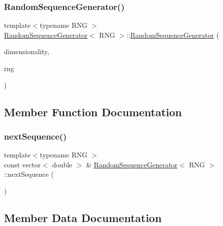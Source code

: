 \subsubsection{\texorpdfstring{Random\+Sequence\+Generator()}{RandomSequenceGenerator()}}
{\footnotesize\ttfamily template$<$typename R\+NG $>$ \\
\hyperlink{class_random_sequence_generator}{Random\+Sequence\+Generator}$<$ R\+NG $>$\+::\hyperlink{class_random_sequence_generator}{Random\+Sequence\+Generator} (\begin{DoxyParamCaption}\item[{vector$<$ double $>$\+::size\+\_\+type}]{dimensionality,  }\item[{const R\+NG \&}]{rng }\end{DoxyParamCaption})}



\subsection{Member Function Documentation}
\hypertarget{class_random_sequence_generator_a63f2d6fdb7f7bab6cdf3506f91cc814c}{}\label{class_random_sequence_generator_a63f2d6fdb7f7bab6cdf3506f91cc814c} 
\subsubsection{\texorpdfstring{next\+Sequence()}{nextSequence()}}
{\footnotesize\ttfamily template$<$typename R\+NG $>$ \\
const vector$<$ double $>$ \& \hyperlink{class_random_sequence_generator}{Random\+Sequence\+Generator}$<$ R\+NG $>$\+::next\+Sequence (\begin{DoxyParamCaption}{ }\end{DoxyParamCaption})}



\subsection{Member Data Documentation}
\hypertarget{class_random_sequence_generator_af950ba4e5e31b62b03997742d1e542ce}{}\label{class_random_sequence_generator_af950ba4e5e31b62b03997742d1e542ce} 

